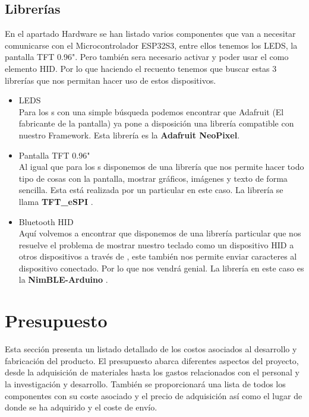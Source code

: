 \subsection{Librerías}
En el apartado Hardware se han listado varios componentes que van a necesitar comunicarse con el Microcontrolador ESP32S3, entre ellos tenemos los \gls{LED}S, la pantalla \gls{TFT} 0.96". Pero también sera necesario activar y poder usar el  como elemento \gls{HID}. Por lo que haciendo el recuento tenemos que buscar estas 3 librerías que nos permitan hacer uso de estos dispositivos.
\begin{itemize}
    \item \gls{LED}S\\
    Para los s con una simple búsqueda podemos encontrar que Adafruit (El fabricante de la pantalla) ya pone a disposición una librería compatible con nuestro Framework. Esta librería es la \textbf{Adafruit NeoPixel}.
    \item Pantalla \gls{TFT} 0.96"\\
    Al igual que para los s disponemos de una librería que nos permite hacer todo tipo de cosas con la pantalla, mostrar gráficos, imágenes y texto de forma sencilla. Esta está realizada por un particular en este caso. La librería se llama \textbf{TFT\_eSPI} \cite{TFTLib}.
    \item Bluetooth \gls{HID}\\
    Aquí volvemos a encontrar que disponemos de una librería particular que nos resuelve el problema de mostrar nuestro teclado como un dispositivo \gls{HID} a otros dispositivos a través de , este también nos permite enviar caracteres al dispositivo conectado. Por lo que nos vendrá genial. La librería en este caso es la \textbf{NimBLE-Arduino} \cite{NimbleLib}.
\end{itemize}

\newpage
\section{Presupuesto}
Esta sección presenta un listado detallado de los costos asociados al desarrollo y fabricación del producto. El presupuesto abarca diferentes aspectos del proyecto, desde la adquisición de materiales hasta los gastos relacionados con el personal y la investigación y desarrollo. También se proporcionará una lista de todos los componentes con su coste asociado y el precio de adquisición así como el lugar de donde se ha adquirido y el coste de envío. 

